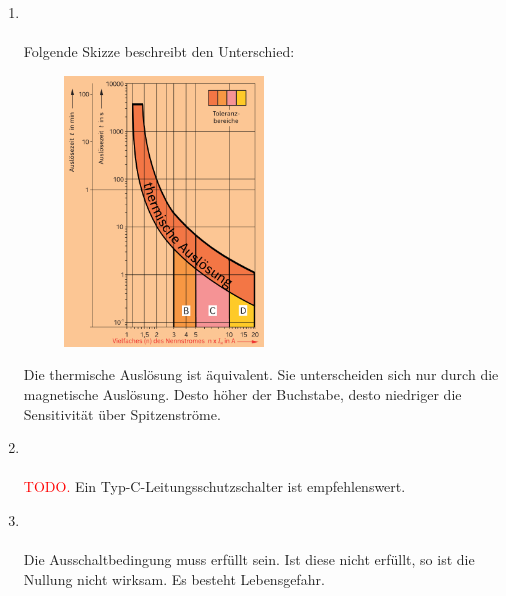 \begin{enumerate}
    \item   {} \\\\
            Folgende Skizze beschreibt den Unterschied:

            \begin{figure}[!htp]
                \centering
                \includegraphics[width = 0.5\textwidth]{img/Auslosecharakteristik.png}
            \end{figure}

            Die thermische Auslösung ist äquivalent. Sie unterscheiden sich nur durch die magnetische Auslösung.
            Desto höher der Buchstabe, desto niedriger die Sensitivität über Spitzenströme.

    \clearpage

    \item   {} \\\\
            \textcolor{red}{TODO.} Ein Typ-C-Leitungsschutzschalter ist empfehlenswert.

    \item   {} \\\\
            Die Ausschaltbedingung muss erfüllt sein. Ist diese nicht erfüllt, so ist die Nullung nicht wirksam. Es besteht Lebensgefahr.


\end{enumerate}
